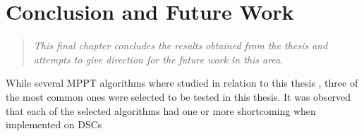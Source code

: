 \chapter{Conclusion and Future Work}
\begin{quote} 
\it This final chapter concludes the results obtained from the thesis and attempts to give direction for the future work in this area.
\end{quote}

While several \ac{MPPT} algorithms where studied in relation to this thesis , three of the most common ones were selected to be tested in this thesis. It was observed that each of the selected algorithms had one or more shortcoming when implemented on \ac{DSCs}    











